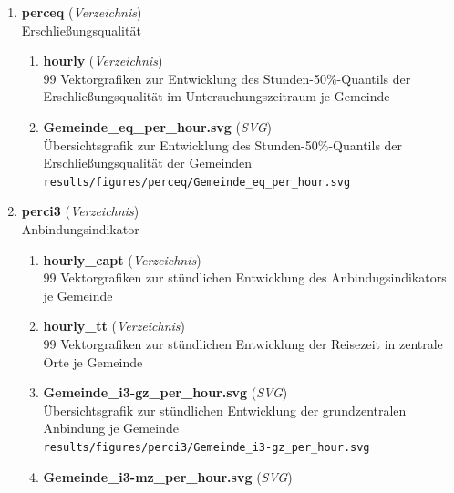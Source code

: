 \begin{enumerate}[label=\arabic*., leftmargin=*, itemsep=0.5em, topsep=0.3em]
\begin{enumerate}[label=\arabic{enumi}.\arabic*, leftmargin=*, itemsep=0.5em, topsep=0.3em]
\begin{enumerate}[label=\arabic{enumi}.\arabic{enumii}.\arabic*, leftmargin=*, itemsep=0.5em, topsep=0.3em]
\begin{enumerate}[label=\arabic{enumi}.\arabic{enumii}.\arabic{enumiii}.\arabic*, leftmargin=*, itemsep=0.5em, topsep=0.3em]
\item \textbf{RegioStaR7\_bq\_per\_hour.svg} \textnormal{(\textit{SVG})}\\
Übersichtsgrafik zur Entwicklung des Stunden-50\%-Quantils der Bedienungsqualität der RegioStaR7-Klassen\\
\texttt{\small results/figures/percbq/RegioStaR7\_bq\_per\_hour.svg}
\end{enumerate}
\item \textbf{perceq} \textnormal{(\textit{Verzeichnis})}\\
Erschließungsqualität
\begin{enumerate}[label=\arabic{enumi}.\arabic{enumii}.\arabic{enumiii}.\arabic*, leftmargin=*, itemsep=0.5em, topsep=0.3em]
\item \textbf{hourly} \textnormal{(\textit{Verzeichnis})}\\
99 Vektorgrafiken zur Entwicklung des Stunden-50\%-Quantils der Erschließungsqualität im Untersuchungszeitraum je Gemeinde
\item \textbf{Gemeinde\_eq\_per\_hour.svg} \textnormal{(\textit{SVG})}\\
Übersichtsgrafik zur Entwicklung des Stunden-50\%-Quantils der Erschließungsqualität der Gemeinden\\
\texttt{\small results/figures/perceq/Gemeinde\_eq\_per\_hour.svg}
\end{enumerate}
\item \textbf{perci3} \textnormal{(\textit{Verzeichnis})}\\
Anbindungsindikator
\begin{enumerate}[label=\arabic{enumi}.\arabic{enumii}.\arabic{enumiii}.\arabic*, leftmargin=*, itemsep=0.5em, topsep=0.3em]
\item \textbf{hourly\_capt} \textnormal{(\textit{Verzeichnis})}\\
99 Vektorgrafiken zur stündlichen Entwicklung des Anbindugsindikators je Gemeinde
\item \textbf{hourly\_tt} \textnormal{(\textit{Verzeichnis})}\\
99 Vektorgrafiken zur stündlichen Entwicklung der Reisezeit in zentrale Orte je Gemeinde
\item \textbf{Gemeinde\_i3-gz\_per\_hour.svg} \textnormal{(\textit{SVG})}\\
Übersichtsgrafik zur stündlichen Entwicklung der grundzentralen Anbindung je Gemeinde\\
\texttt{\small results/figures/perci3/Gemeinde\_i3-gz\_per\_hour.svg}
\item \textbf{Gemeinde\_i3-mz\_per\_hour.svg} \textnormal{(\textit{SVG})}\\

\end{enumerate}
\end{enumerate}
\end{enumerate}
\end{enumerate}
